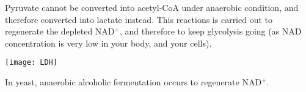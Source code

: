 Pyruvate cannot be converted into acetyl-CoA under anaerobic condition, and therefore converted into lactate instead.
This reactions is carried out to regenerate the depleted NAD$^+$, and therefore to keep glycolysis going (as NAD concentration is very low in your body, and your cells).

\begin{center}
\end{center}

\begin{center}
\texttt{[image: LDH]}
\end{center}

In yeast, anaerobic alcoholic fermentation occurs to regenerate NAD$^+$.

